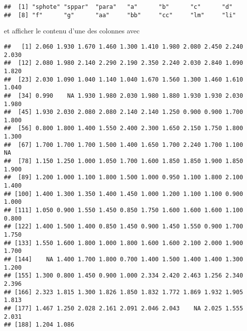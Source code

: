 \begin{knitrout}
\color{fgcolor}\begin{kframe}
\begin{flushleft}
\ttfamily\noindent
{}\hlkeyword{(}\hlkeyword{)}\mbox{}
\normalfont
\end{flushleft}
\begin{verbatim}
##  [1] "sphote" "sppar"  "para"   "a"      "b"      "c"      "d"     
##  [8] "f"      "g"      "aa"     "bb"     "cc"     "lm"     "li"    
\end{verbatim}
\end{kframe}
\end{knitrout}


\noindent et afficher le contenu d'une des colonnes avec

\begin{knitrout}
\color{fgcolor}\begin{kframe}
\begin{flushleft}
\ttfamily\noindent
{}\hlkeyword{\usebox{\hlnormalsizeboxdollar}}\mbox{}
\normalfont
\end{flushleft}
\begin{verbatim}
##   [1] 2.060 1.930 1.670 1.460 1.300 1.410 1.980 2.080 2.450 2.240 2.030
##  [12] 2.080 1.980 2.140 2.290 2.190 2.350 2.240 2.030 2.840 1.090 1.820
##  [23] 2.030 1.090 1.040 1.140 1.040 1.670 1.560 1.300 1.460 1.610 1.040
##  [34] 0.990    NA 1.930 1.980 2.030 1.980 1.880 1.930 1.930 2.030 1.980
##  [45] 1.930 2.030 2.080 2.080 2.140 2.140 1.250 0.900 0.900 1.700 1.800
##  [56] 0.800 1.800 1.400 1.550 2.400 2.300 1.650 2.150 1.750 1.800 1.300
##  [67] 1.700 1.700 1.700 1.500 1.400 1.650 1.700 2.240 1.700 1.100    NA
##  [78] 1.150 1.250 1.000 1.050 1.700 1.600 1.850 1.850 1.900 1.850 1.900
##  [89] 1.200 1.000 1.100 1.800 1.500 1.000 0.950 1.100 1.800 2.100 1.400
## [100] 1.400 1.300 1.350 1.400 1.450 1.000 1.200 1.100 1.100 0.900 1.000
## [111] 1.050 0.900 1.550 1.450 0.850 1.750 1.600 1.600 1.600 1.100 0.800
## [122] 1.400 1.500 1.400 0.850 1.450 0.900 1.450 1.550 0.900 1.700 1.750
## [133] 1.550 1.600 1.800 1.000 1.800 1.600 1.600 2.100 2.000 1.900 1.700
## [144]    NA 1.400 1.700 1.800 0.700 1.400 1.500 1.400 1.400 1.300 1.200
## [155] 1.300 0.800 1.450 0.900 1.000 2.334 2.420 2.463 1.256 2.340 2.396
## [166] 2.323 1.815 1.300 1.826 1.850 1.832 1.772 1.869 1.932 1.905 1.813
## [177] 1.467 1.250 2.028 2.161 2.091 2.046 2.043    NA 2.025 1.555 2.031
## [188] 1.204 1.086
\end{verbatim}
\end{kframe}
\end{knitrout}



